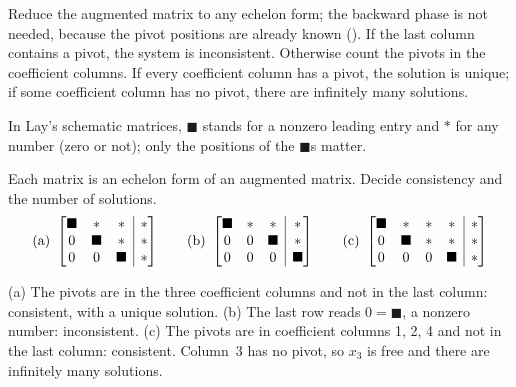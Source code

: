 \documentclass[10pt]{scrartcl}
\makeatletter
\newcommand{\aug}[2]{\left[\begin{array}{@{}#1@{}}#2\end{array}\right]}
\newcommand{\nz}{\blacksquare}
\makeatother
\begin{document}
\begin{steps}
  \ii Reduce the augmented matrix to any echelon form; the backward phase is not needed, because the pivot positions are already known ().
  \ii If the last column contains a pivot, the system is inconsistent.
  \ii Otherwise count the pivots in the coefficient columns. If every coefficient column has a pivot, the solution is unique; if some coefficient column has no pivot, there are infinitely many solutions.
\end{steps}
In Lay's schematic matrices, $\nz$ stands for a nonzero leading entry and $*$ for any number (zero or not); only the positions of the $\nz$s matter.

\begin{example*}
Each matrix is an echelon form of an augmented matrix. Decide consistency and the number of solutions.
\[
  \text{(a)}\ \aug{ccc|c}{\nz&*&*&*\\0&\nz&*&*\\0&0&\nz&*}\qquad
  \text{(b)}\ \aug{ccc|c}{\nz&*&*&*\\0&0&\nz&*\\0&0&0&\nz}\qquad
  \text{(c)}\ \aug{cccc|c}{\nz&*&*&*&*\\0&\nz&*&*&*\\0&0&0&\nz&*}
\]
\begin{itemize}
  \ii (a) The pivots are in the three coefficient columns and not in the last column: consistent, with a unique solution.
  \ii (b) The last row reads $0=\nz$, a nonzero number: inconsistent.
  \ii (c) The pivots are in coefficient columns 1, 2, 4 and not in the last column: consistent. Column~3 has no pivot, so $x_3$ is free and there are infinitely many solutions.
\end{itemize}
\end{example*}
\end{document}
